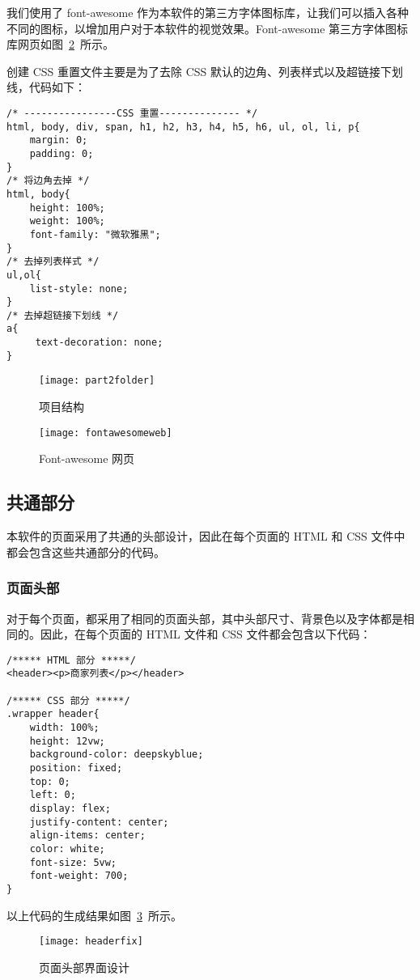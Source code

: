 我们使用了 font-awesome 作为本软件的第三方字体图标库，让我们可以插入各种不同的图标，以增加用户对于本软件的视觉效果。Font-awesome 第三方字体图标库网页如图~\ref{fig:fontawesomeweb}~所示。

创建 CSS 重置文件主要是为了去除 CSS 默认的边角、列表样式以及超链接下划线，代码如下：
\begin{lstlisting}[basicstyle=\footnotesize]
/* ----------------CSS 重置-------------- */
html, body, div, span, h1, h2, h3, h4, h5, h6, ul, ol, li, p{
    margin: 0;
    padding: 0;
}
/* 将边角去掉 */
html, body{
    height: 100%;
    weight: 100%;
    font-family: "微软雅黑";
}
/* 去掉列表样式 */
ul,ol{
    list-style: none;
}
/* 去掉超链接下划线 */
a{
     text-decoration: none;
}
\end{lstlisting}
\begin{figure}[htbp]
    \centering
    \texttt{[image: part2folder]}
    \caption{项目结构}\label{fig:part2folder}
    \vspace{\baselineskip}
\end{figure}
\begin{figure}[htbp]
    \centering
    \texttt{[image: fontawesomeweb]}
    \caption{Font-awesome 网页}\label{fig:fontawesomeweb}
    \vspace{\baselineskip}
\end{figure}

\subsection{共通部分}
本软件的页面采用了共通的头部设计，因此在每个页面的 HTML 和 CSS 文件中都会包含这些共通部分的代码。
\subsubsection{页面头部}
对于每个页面，都采用了相同的页面头部，其中头部尺寸、背景色以及字体都是相同的。因此，在每个页面的 HTML 文件和 CSS 文件都会包含以下代码：
\begin{lstlisting}[basicstyle=\footnotesize]
/***** HTML 部分 *****/
<header><p>商家列表</p></header>

/***** CSS 部分 *****/
.wrapper header{
	width: 100%;
	height: 12vw;
	background-color: deepskyblue;
	position: fixed;
	top: 0;
	left: 0;
	display: flex;
	justify-content: center;
	align-items: center;
	color: white;
	font-size: 5vw;
	font-weight: 700;
}
\end{lstlisting}    
以上代码的生成结果如图~\ref{fig:headerfix}~所示。
\begin{figure}[htbp]
    \centering
    \texttt{[image: headerfix]}
    \caption{页面头部界面设计}\label{fig:headerfix}
    \vspace{\baselineskip}
\end{figure}

